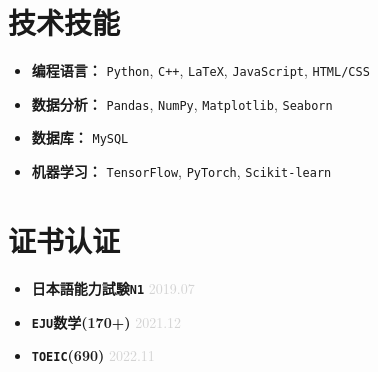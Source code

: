 \documentclass[11pt,a4paper]{article}
\newcommand{\resumeItem}[2]{
    \item \textbf{#1} \hfill \textcolor{lightgray}{#2}
}
\begin{document}
\section*{技术技能}
\begin{itemize}
    \item \textbf{编程语言：} \texttt{Python}, \texttt{C++}, \texttt{LaTeX}, \texttt{JavaScript}, \texttt{HTML/CSS}
    \item \textbf{数据分析：} \texttt{Pandas}, \texttt{NumPy}, \texttt{Matplotlib}, \texttt{Seaborn}
    \item \textbf{数据库：} \quad \texttt{MySQL}
    \item \textbf{机器学习：} \texttt{TensorFlow}, \texttt{PyTorch}, \texttt{Scikit-learn}
\end{itemize}


\section*{证书认证}
\begin{itemize}
    \resumeItem{日本語能力試験\texttt{N1}}{2019.07}
    \resumeItem{\texttt{EJU}数学(170+)}{2021.12}
    \resumeItem{\texttt{TOEIC}(690)}{2022.11}

\end{itemize}

\end{document}
